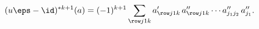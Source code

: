 \begin{equation}
(u \eps -\id)^{*k+1}(a) = (-1)^{k+1} \sum_{\row j1k}
a'_{\row j1k} \, a''_{\row j1k} \cdots a''_{j_1 j_2} \, a''_{j_1}.
\label{eq:many-conv}%
\end{equation}

